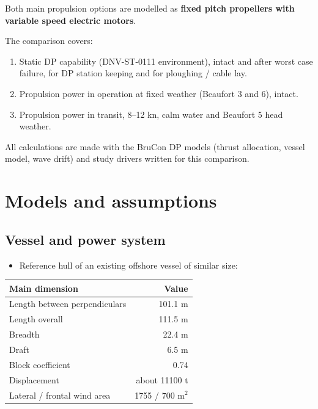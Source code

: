 \documentclass[a4paper,11pt]{article}
\begin{document}
Both main propulsion options are modelled as \textbf{fixed pitch propellers with variable
speed electric motors}.

The comparison covers:
\begin{enumerate}
\item Static DP capability (DNV-ST-0111 environment), intact and after worst case
failure, for DP station keeping and for ploughing / cable lay.
\item Propulsion power in operation at fixed weather (Beaufort 3 and 6), intact.
\item Propulsion power in transit, 8--12 kn, calm water and Beaufort 5 head weather.
\end{enumerate}

All calculations are made with the BruCon DP models (thrust allocation, vessel
model, wave drift) and study drivers written for this comparison.

\section{Models and assumptions}
\label{sec:org3e066b8}

\subsection{Vessel and power system}
\label{sec:org5623f0c}
\begin{itemize}
\item Reference hull of an existing offshore vessel of similar size:
\end{itemize}

\begin{center}
\begin{tabular}{lr}
\toprule
Main dimension & Value\\[0pt]
\midrule
Length between perpendiculars & 101.1 m\\[0pt]
Length overall & 111.5 m\\[0pt]
Breadth & 22.4 m\\[0pt]
Draft & 6.5 m\\[0pt]
Block coefficient & 0.74\\[0pt]
Displacement & about 11100 t\\[0pt]
Lateral / frontal wind area & 1755 / 700 m\(^2\)\\[0pt]
\bottomrule
\end{tabular}
\end{center}
\end{document}
